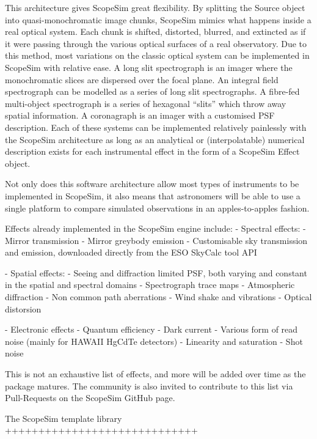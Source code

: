 This architecture gives ScopeSim great flexibility. By splitting the Source
object into quasi-monochromatic image chunks, ScopeSim mimics what happens
inside a real optical system. Each chunk is shifted, distorted, blurred, and
extincted as if it were passing through the various optical surfaces
of a real observatory. Due to this method, most variations on the classic
optical system can be implemented in ScopeSim with relative ease. A long slit
spectrograph is an imager where the monochromatic slices are dispersed
over the focal plane. An integral field spectrograph can be modelled as a series
of long slit spectrographs. A fibre-fed multi-object spectrograph is a series of
hexagonal ``slits'' which throw away spatial information. A coronagraph is an
imager with a customised PSF description. Each of these systems can be
implemented relatively painlessly with the ScopeSim architecture as long as an
analytical or (interpolatable) numerical description exists for each
instrumental effect in the form of a ScopeSim Effect object.

Not only does this software architecture allow most types of instruments to be
implemented in ScopeSim, it also means that astronomers will be able to use a
single platform to compare simulated observations in an apples-to-apples
fashion.

Effects already implemented in the ScopeSim engine include:
- Spectral effects:
    - Mirror transmission
    - Mirror greybody emission
    - Customisable sky transmission and emission, downloaded directly from the
      ESO SkyCalc tool API

- Spatial effects:
    - Seeing and diffraction limited PSF, both varying and constant in the
      spatial and spectral domains
    - Spectrograph trace maps
    - Atmospheric diffraction
    - Non common path aberrations
    - Wind shake and vibrations
    - Optical distorsion

- Electronic effects
    - Quantum efficiency
    - Dark current
    - Various form of read noise (mainly for HAWAII HgCdTe detectors)
    - Linearity and saturation
    - Shot noise

This is not an exhaustive list of effects, and more will be added over time as
the package matures. The community is also invited to contribute to this list
via Pull-Requests on the ScopeSim GitHub page.


The ScopeSim template library
+++++++++++++++++++++++++++++






